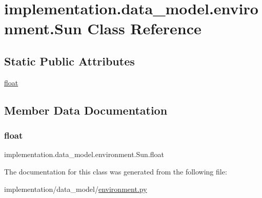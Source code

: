 \hypertarget{classimplementation_1_1data__model_1_1environment_1_1_sun}{}\section{implementation.\+data\+\_\+model.\+environment.\+Sun Class Reference}
\label{classimplementation_1_1data__model_1_1environment_1_1_sun}
\subsection*{Static Public Attributes}
\begin{DoxyCompactItemize}
\item 
\hyperlink{classimplementation_1_1data__model_1_1environment_1_1_sun_ae4abaa94c84d5a3a3b3804f4a5da9601}{float}
\end{DoxyCompactItemize}


\subsection{Member Data Documentation}
\mbox{\label{classimplementation_1_1data__model_1_1environment_1_1_sun_ae4abaa94c84d5a3a3b3804f4a5da9601}} 
\subsubsection{\texorpdfstring{float}{float}}
{\footnotesize\ttfamily implementation.\+data\+\_\+model.\+environment.\+Sun.\+float\hspace{0.3cm}{\ttfamily [static]}}



The documentation for this class was generated from the following file\+:\begin{DoxyCompactItemize}
\item 
implementation/data\+\_\+model/\hyperlink{environment_8py}{environment.\+py}\end{DoxyCompactItemize}
